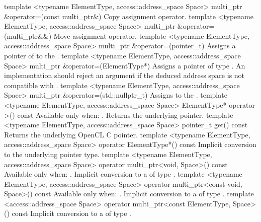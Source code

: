 \addRowTwoL
{template <typename ElementType, access::address_space Space>}
{multi_ptr \&operator=(const multi_ptr\&)}
{Copy assignment operator.}
\addRowTwoL
{template <typename ElementType, access::address_space Space>}
{multi_ptr \&operator=(multi_ptr\&\&)}
{Move assignment operator.}
\addRowTwoL
{template <typename ElementType, access::address_space Space>}
{multi_ptr \&operator=(pointer_t)}
{Assigns a pointer of  to the .}
\addRowTwoL
{template <typename ElementType, access::address_space Space>}
{multi_ptr \&operator=(ElementType*)}
{Assigns a pointer of type .
An implementation should reject an argument if the deduced address space is not compatible with .}
\addRowTwoL
{template <typename ElementType, access::address_space Space>}
{multi_ptr \&operator=(std::nullptr_t)}
{Assigns  to the .}
\addRowTwoL
{template <typename ElementType, access::address_space Space>}
{ElementType* operator->() const}
{Available only when: .
\newline
Returns the underlying pointer.}
\addRowTwoL
{template <typename ElementType, access::address_space Space>}
{pointer_t get() const}
{Returns the underlying OpenCL C pointer.}
\addRowTwoL
{template <typename ElementType, access::address_space Space>}
{operator ElementType*() const}
{Implicit conversion to the underlying pointer type.}
\addRowTwoL
{template <typename ElementType, access::address_space Space>}
{operator multi_ptr<void, Space>() const}
{Available only when:
.
\newline
Implicit conversion to a  of type .}
\addRowTwoL
{template <typename ElementType, access::address_space Space>}
{operator multi_ptr<const void, Space>() const}
{Available only when:
.
\newline
Implicit conversion to a  of type .}
\addRowTwoL
{template <access::address_space Space>}
{operator multi_ptr<const ElementType, Space>() const}
{Implicit conversion to a 
of type .}
